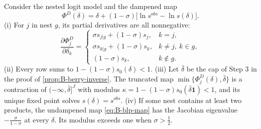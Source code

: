 \begin{proposition}\label{prop:B-nl-dampening}
Consider the nested logit model and the dampened map
\begin{equation}\label{eq:B-nl-dampened}
  \Phi^D(\delta) = \delta + (1 - \sigma)\big[\ln s^{obs} - \ln s(\delta)\big].
\end{equation}
(i) For $j$ in nest $g$, its partial derivatives are all nonnegative:
\begin{equation*}
  \frac{\partial\Phi^D_j}{\partial\delta_k} =
  \begin{cases}
    \sigma s_{j|g} + (1 - \sigma)s_j, & k = j,\\[2pt]
    \sigma s_{k|g} + (1 - \sigma)s_k, & k \neq j,\ k \in g,\\[2pt]
    (1 - \sigma)s_k, & k \notin g.
  \end{cases}
\end{equation*} (ii) Every row sums to $1 - (1 - \sigma)s_0(\delta) < 1$. (iii) Let $\bar\delta$ be the cap of
Step 3 in the proof of \cref{prop:B-berry-inverse}. The truncated map $\min\{\Phi^D_j(\delta), \bar\delta\}$ is a
contraction of $(-\infty, \bar\delta]^J$ with modulus $\kappa = 1 - (1 - \sigma)s_0(\bar\delta\mathbf{1}) < 1$,
and its unique fixed point solves $s(\delta) = s^{obs}$. (iv) If some nest contains at least two products,
the undampened map \eqref{eq:B-blp-map} has the Jacobian eigenvalue $-\frac{\sigma}{1-\sigma}$ at every
$\delta$. Its modulus exceeds one when $\sigma > \frac{1}{2}$.
\end{proposition}

